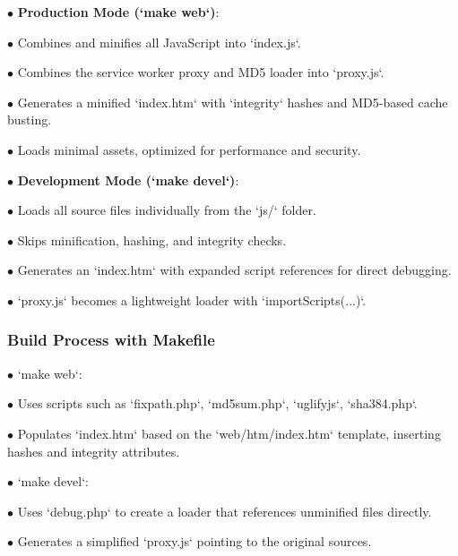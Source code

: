\documentclass[a4paper]{article}
\begin{document}
\begin{compactitem}
\item[\color{myblue}$\bullet$] \textbf{Production Mode (`make web`)}:
  \begin{compactitem}
  \item[\color{myblue}$\bullet$] Combines and minifies all JavaScript into `index.js`.
  \item[\color{myblue}$\bullet$] Combines the service worker proxy and MD5 loader into `proxy.js`.
  \item[\color{myblue}$\bullet$] Generates a minified `index.htm` with `integrity` hashes and MD5-based cache busting.
  \item[\color{myblue}$\bullet$] Loads minimal assets, optimized for performance and security.
  \end{compactitem}
\item[\color{myblue}$\bullet$] \textbf{Development Mode (`make devel`)}:
  \begin{compactitem}
  \item[\color{myblue}$\bullet$] Loads all source files individually from the `js/` folder.
  \item[\color{myblue}$\bullet$] Skips minification, hashing, and integrity checks.
  \item[\color{myblue}$\bullet$] Generates an `index.htm` with expanded script references for direct debugging.
  \item[\color{myblue}$\bullet$] `proxy.js` becomes a lightweight loader with `importScripts(...)`.
  \end{compactitem}
\end{compactitem}

\hypertarget{toc45}{}
\subsubsection{Build Process with Makefile}

\begin{compactitem}
\item[\color{myblue}$\bullet$] `make web`:
  \begin{compactitem}
  \item[\color{myblue}$\bullet$] Uses scripts such as `fixpath.php`, `md5sum.php`, `uglifyjs`, `sha384.php`.
  \item[\color{myblue}$\bullet$] Populates `index.htm` based on the `web/htm/index.htm` template, inserting hashes and integrity attributes.
  \end{compactitem}
\item[\color{myblue}$\bullet$] `make devel`:
  \begin{compactitem}
  \item[\color{myblue}$\bullet$] Uses `debug.php` to create a loader that references unminified files directly.
  \item[\color{myblue}$\bullet$] Generates a simplified `proxy.js` pointing to the original sources.
  \end{compactitem}
\end{compactitem}
\end{document}
